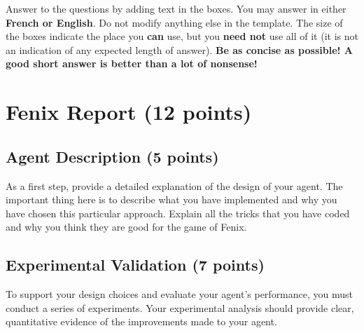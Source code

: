 \documentclass[11pt,a4paper]{report}
\begin{document}
\maketitle

Answer to the questions by adding text in the boxes. You may answer in either \textbf{French or English}. Do not modify anything else in the template.  The size of the boxes indicate the place you \textbf{can} use, but you \textbf{need not} use all of it (it is not an indication of any expected length of answer). \textbf{Be as concise as possible! A good short answer is better than a lot of nonsense!}

\section{Fenix Report (12 points)}

\subsection{Agent Description (5 points)}

As a first step, provide a detailed explanation of the design of your agent. The important thing here is to describe what you have implemented and why you have chosen this particular approach. Explain all the tricks that you have coded and why you think they are good for the game of Fenix.

\begin{answers}[10cm]
\end{answers}

\begin{answers}[23cm]
\end{answers}

\newpage
\subsection{Experimental Validation (7 points)}

To support your design choices and evaluate your agent's performance, you must conduct a series of experiments. Your experimental analysis should provide clear, quantitative evidence of the improvements made to your agent.

\begin{answers}[20cm]
\end{answers}

\begin{answers}[23cm]
\end{answers}

\begin{answers}[23cm]
\end{answers}
\end{document}
